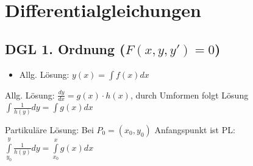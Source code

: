 \documentclass[a4paper]{article}
\begin{document}
	
\newpage
\section{Differentialgleichungen}

% 			
% 
	\subsection{DGL 1. Ordnung  ($F(x,y,y') = 0$)}
		\begin{fmerke}[Elementare DGL \hspace{8mm} ($y' = f(x)$)]
				\vspace{1mm}
			\begin{itemize}
				\item Allg. Lösung: $y(x)=\int{f(x)dx}$
			\end{itemize}
			\vspace{-3mm}
		\end{fmerke}

		\begin{fmerke}[Separierbare DGL \hspace{6mm} ($y' = g(x) \cdot h(x)$)]
				\vspace{1mm}
			\begin{itemize_compact}
				\item Allg. Lösung: $\frac{dy}{dx} = g(x) \cdot h(x)$, durch Umformen folgt Lösung $\int{\frac{1}{h(y)}dy}=\int{g(x)dx}$
				\item Partikuläre Lösung: Bei $P_0=(x_0,y_0)$ Anfangspunkt ist PL: $\int\limits_{y_0}^{y}{\frac{1}{h(y)}dy}=\int\limits_{x_0}^{x}{g(x)dx}$
			\end{itemize_compact}
				\vspace{-3mm}
		\end{fmerke}
		
\end{document}
